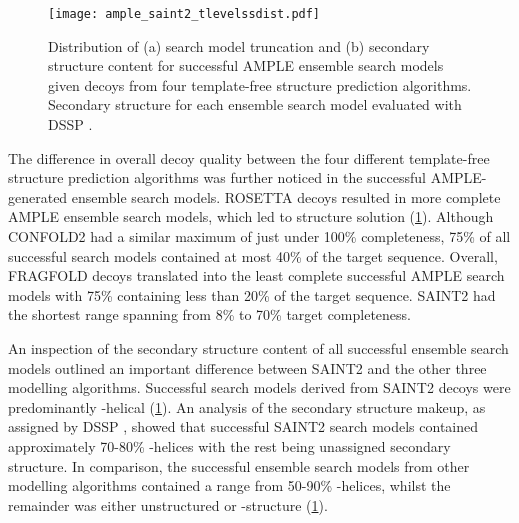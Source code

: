 \begin{figure}[H]
    \centering
    \texttt{[image: ample\_saint2\_tlevelssdist.pdf]}
    \caption[Distribution of search model truncation and secondary structure content]{Distribution of (a) search model truncation and (b) secondary structure content for successful AMPLE ensemble search models given decoys from four template-free structure prediction algorithms. Secondary structure for each ensemble search model evaluated with DSSP \cite{Frishman1995-si}.}
    \label{fig:ample_saint2_tlevelssdist}
\end{figure}

The difference in overall decoy quality between the four different template-free structure prediction algorithms was further noticed in the successful AMPLE-generated ensemble search models. ROSETTA decoys resulted in more complete AMPLE ensemble search models, which led to structure solution (\cref{fig:ample_saint2_tlevelssdist}). Although CONFOLD2 had a similar maximum of just under 100\% completeness, 75\% of all successful search models contained at most 40\% of the target sequence. Overall, FRAGFOLD decoys translated into the least complete successful AMPLE search models with 75\% containing less than 20\% of the target sequence. SAINT2 had the shortest range spanning from 8\% to 70\% target completeness.

An inspection of the secondary structure content of all successful ensemble search models outlined an important difference between SAINT2 and the other three modelling algorithms. Successful search models derived from SAINT2 decoys were predominantly \textalpha-helical (\cref{fig:ample_saint2_tlevelssdist}). An analysis of the secondary structure makeup, as assigned by DSSP \cite{Frishman1995-si}, showed that successful SAINT2 search models contained approximately 70-80\% \textalpha-helices with the rest being unassigned secondary structure. In comparison, the successful ensemble search models from other modelling algorithms contained a range from 50-90\% \textalpha-helices, whilst the remainder was either unstructured or \textbeta-structure (\cref{fig:ample_saint2_tlevelssdist}).

